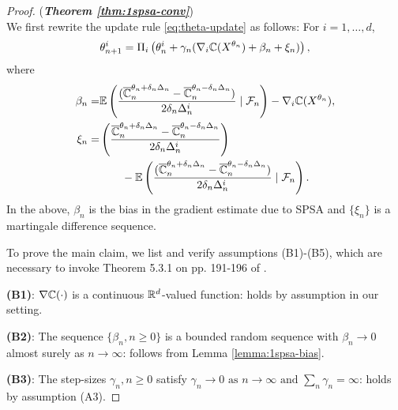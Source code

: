 \begin{proof}(\textbf{\textit{Theorem \ref{thm:1spsa-conv}}})\ \\
We first rewrite the update rule \eqref{eq:theta-update} as follows: For $i=1,\ldots,d$,
\begin{align}
\theta^{i}_{n+1}  =  \Pi_i\left(\theta^{i}_n +  \gamma_n(\nabla_{i} \mathbb{C}(X^{\theta_n}) + \beta_n + \xi_n)\right), 
\label{eq:1spsa-equiv}
\end{align}
where 
\begin{align*}
\beta_n = &\mathbb{E}\left(\dfrac{(\overline {\mathbb{C}}_n^{\theta_n + \delta_n \Delta_n} -\overline {\mathbb{C}}_n^{\theta_n - \delta_n \Delta_n})}{2 \delta_n \Delta_n^{i}} \mid \mathcal{F}_n \right) - \nabla_i \mathbb{C}(X^{\theta_n}),\\
\xi_n = & \left(\dfrac{\overline {\mathbb{C}}_n^{\theta_n + \delta_n \Delta_n} -\overline {\mathbb{C}}_n^{\theta_n - \delta_n \Delta_n}}{2 \delta_n\Delta_n^{i}}\right) \\
&\qquad - \mathbb{E}\left(\dfrac{(\overline {\mathbb{C}}_n^{\theta_n + \delta_n \Delta_n} -\overline {\mathbb{C}}_n^{\theta_n - \delta_n \Delta_n})}{2 \delta_n \Delta_n^{i}}\mid \mathcal{F}_n \right).
\end{align*}
In the above, $\beta_n$ is the bias in the gradient estimate due to SPSA and $\{\xi_n\}$ is a martingale difference sequence.

To prove the main claim, we list and verify assumptions (B1)-(B5), which are necessary to invoke Theorem 5.3.1 on pp. 191-196 of \cite{kushner-clark}. 

\noindent\textbf{(B1)}: $\nabla \mathbb{C}(\cdot)$ is a continuous $\mathbb{R}^{d}$-valued function: holds by assumption in our setting.

\noindent\textbf{(B2)}:  The sequence $\{\beta_n,n\geq 0\}$ is a bounded random sequence with
$\beta_n \rightarrow 0$ almost surely as $n\rightarrow \infty$: follows from Lemma \ref{lemma:1spsa-bias}.

\noindent\textbf{(B3)}: The step-sizes $\gamma_n,n\geq 0$ satisfy
$  \gamma_n\rightarrow 0 \mbox{ as }n\rightarrow\infty \text{ and } \sum_n \gamma_n=\infty$: holds by assumption (A3). 


\end{proof}
